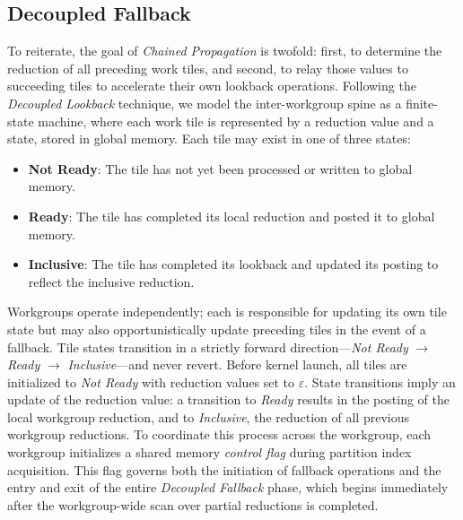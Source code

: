 \documentclass[sigconf,screen]{acmart}
\begin{document}
\subsection{Decoupled Fallback}
To reiterate, the goal of \emph{Chained Propagation} is twofold: first, to determine the reduction of all preceding work tiles, and second, to relay those values to succeeding tiles to accelerate their own lookback operations. Following the \emph{Decoupled Lookback} technique, we model the inter-workgroup spine as a finite-state machine, where each work tile is represented by a reduction value and a state, stored in global memory. Each tile may exist in one of three states:
\begin{itemize}
  \item \textbf{Not Ready}: The tile has not yet been processed or written to global memory.
  \item \textbf{Ready}: The tile has completed its local reduction and posted it to global memory.
  \item \textbf{Inclusive}: The tile has completed its lookback and updated its posting to reflect the inclusive reduction.
\end{itemize}
Workgroups operate independently; each is responsible for updating its own tile state but may also opportunistically update preceding tiles in the event of a fallback. Tile states transition in a strictly forward direction---\emph{Not Ready} $\rightarrow$ \emph{Ready} $\rightarrow$ \emph{Inclusive}---and never revert. Before kernel launch, all tiles are initialized to \emph{Not Ready} with reduction values set to $\varepsilon$. State transitions imply an update of the reduction value: a transition to \emph{Ready} results in the posting of the local workgroup reduction, and to \emph{Inclusive}, the reduction of all previous workgroup reductions. To coordinate this process across the workgroup, each workgroup initializes a shared memory \emph{control flag} during partition index acquisition. This flag governs both the initiation of fallback operations and the entry and exit of the entire \emph{Decoupled Fallback} phase, which begins immediately after the workgroup-wide scan over partial reductions is completed.
\end{document}
